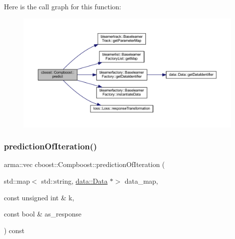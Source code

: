Here is the call graph for this function\+:
\nopagebreak
\begin{figure}[H]
\begin{center}
\leavevmode
\includegraphics[width=350pt]{classcboost_1_1_compboost_a51c59cdddec77c2bed757aadad6afe1d_cgraph}
\end{center}
\end{figure}
\mbox{\label{classcboost_1_1_compboost_abd00401a8914cde27a93673e12ab3468}} 
\subsubsection{\texorpdfstring{prediction\+Of\+Iteration()}{predictionOfIteration()}}
{\footnotesize\ttfamily arma\+::vec cboost\+::\+Compboost\+::prediction\+Of\+Iteration (\begin{DoxyParamCaption}\item[{std\+::map$<$ std\+::string, \mbox{\hyperlink{classdata_1_1_data}{data\+::\+Data}} $\ast$$>$}]{data\+\_\+map,  }\item[{const unsigned int \&}]{k,  }\item[{const bool \&}]{as\+\_\+response }\end{DoxyParamCaption}) const}

